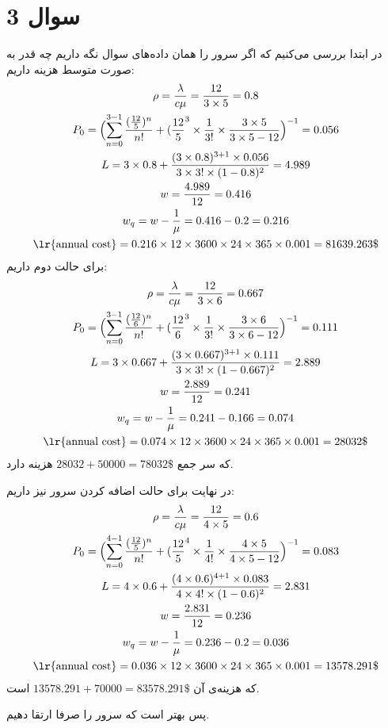 \section*{سوال 3}
در ابتدا بررسی می‌کنیم که اگر سرور را همان داده‌های سوال نگه داریم چه قدر به صورت متوسط هزینه داریم:
\begin{gather*}
    \rho = \frac{\lambda}{c \mu} = \frac{12}{3 \times 5} = 0.8\\
    P_0 = \Bigl(\sum_{n=0}^{3-1} \frac{(\frac{12}{5})^n}{n!} + (\frac{12}{5}^{3} \times \frac{1}{3!} \times \frac{3 \times 5}{3 \times 5 - 12}\Bigr)^{-1} = 0.056\\
    L = 3 \times 0.8 + \frac{(3 \times 0.8)^{3+1} \times 0.056}{3 \times 3! \times (1 - 0.8)^2} = 4.989\\
    w = \frac{4.989}{12} = 0.416\\
    w_q = w - \frac{1}{\mu} = 0.416 - 0.2 = 0.216\\
    \text{\lr{annual cost}} = 0.216 \times 12 \times 3600 \times 24 \times 365 \times 0.001 = 81639.263\$
\end{gather*}
برای حالت دوم داریم:
\begin{gather*}
    \rho = \frac{\lambda}{c \mu} = \frac{12}{3 \times 6} = 0.667\\
    P_0 = \Bigl(\sum_{n=0}^{3-1} \frac{(\frac{12}{6})^n}{n!} + (\frac{12}{6}^{3} \times \frac{1}{3!} \times \frac{3 \times 6}{3 \times 6 - 12}\Bigr)^{-1} = 0.111\\
    L = 3 \times 0.667 + \frac{(3 \times 0.667)^{3+1} \times 0.111}{3 \times 3! \times (1 - 0.667)^2} = 2.889\\
    w = \frac{2.889}{12} = 0.241\\
    w_q = w - \frac{1}{\mu} = 0.241 - 0.166 = 0.074\\
    \text{\lr{annual cost}} = 0.074 \times 12 \times 3600 \times 24 \times 365 \times 0.001 = 28032\$
    \end{gather*}
که سر جمع
$28032 + 50000 = 78032\$$
هزینه دارد.

در نهایت برای حالت اضافه کردن سرور نیز داریم:
\begin{gather*}
    \rho = \frac{\lambda}{c \mu} = \frac{12}{4 \times 5} = 0.6\\
    P_0 = \Bigl(\sum_{n=0}^{4-1} \frac{(\frac{12}{5})^n}{n!} + (\frac{12}{5}^{4} \times \frac{1}{4!} \times \frac{4 \times 5}{4 \times 5 - 12}\Bigr)^{-1} = 0.083\\
    L = 4 \times 0.6 + \frac{(4 \times 0.6)^{4+1} \times 0.083}{4 \times 4! \times (1 - 0.6)^2} = 2.831\\
    w = \frac{2.831}{12} = 0.236\\
    w_q = w - \frac{1}{\mu} = 0.236 - 0.2 = 0.036\\
    \text{\lr{annual cost}} = 0.036 \times 12 \times 3600 \times 24 \times 365 \times 0.001 = 13578.291\$
\end{gather*}
که هزینه‌ی آن
$13578.291 + 70000 = 83578.291\$$
است.

پس بهتر است که سرور را صرفا ارتقا دهیم.